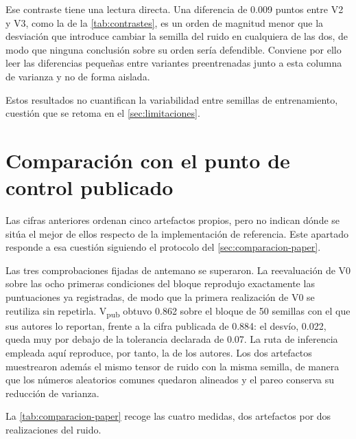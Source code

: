 Ese contraste tiene una lectura directa. Una diferencia de \num{0.009} puntos entre V2 y V3,
como la de la \cref{tab:contrastes}, es un orden de magnitud menor que la desviaci\'on que
introduce cambiar la semilla del ruido en cualquiera de las dos, de modo que ninguna
conclusi\'on sobre su orden ser\'ia defendible. Conviene por ello leer las diferencias
peque\~nas entre variantes preentrenadas junto a esta columna de varianza y no de forma
aislada.

Estos resultados no cuantifican la variabilidad entre semillas de entrenamiento, cuesti\'on
que se retoma en el \cref{sec:limitaciones}.

\section{Comparaci\'on con el punto de control publicado}
\label{sec:resultado-paper}

Las cifras anteriores ordenan cinco artefactos propios, pero no indican d\'onde se sit\'ua el
mejor de ellos respecto de la implementaci\'on de referencia. Este apartado responde a esa
cuesti\'on siguiendo el protocolo del \cref{sec:comparacion-paper}.


Las tres comprobaciones fijadas de antemano se superaron. La reevaluaci\'on de V0 sobre las
ocho primeras condiciones del bloque reprodujo exactamente las puntuaciones ya registradas,
de modo que la primera realizaci\'on de V0 se reutiliza sin repetirla. V\textsubscript{pub}
obtuvo \num{0.862} sobre el bloque de \num{50} semillas con el que sus autores lo reportan,
frente a la cifra publicada de \num{0.884}: el desv\'io, \num{0.022}, queda muy por debajo de
la tolerancia declarada de \num{0.07}. La ruta de inferencia empleada aqu\'i reproduce, por
tanto, la de los autores. Los dos artefactos muestrearon adem\'as el mismo tensor de ruido
con la misma semilla, de manera que los n\'umeros aleatorios comunes quedaron alineados y el
pareo conserva su reducci\'on de varianza.


La \cref{tab:comparacion-paper} recoge las cuatro medidas, dos artefactos por dos
realizaciones del ruido.

